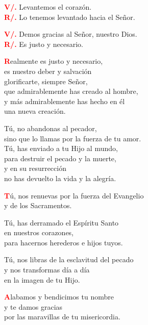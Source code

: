 \documentclass[12pt, letterpaper]{report}
\begin{document}
\noindent
\Large {\bfseries \textcolor{red}{V/.}} \hspace{0.5cm} Levantemos el coraz\'on.\\
\noindent
\Large {\bfseries \textcolor{red}{R/.}} \hspace{0.5cm} Lo tenemos levantado hacia el Se\~nor. 

\noindent
\Large {\bfseries \textcolor{red}{V/.}} \hspace{0.5cm} Demos gracias al Se\~nor, nuestro Dios.\\
\noindent
\Large {\bfseries \textcolor{red}{R/.}} \hspace{0.5cm} Es justo y necesario.

\lettrine[lines=2]{\bfseries \textcolor{red}{R}}{}\Large ealmente es justo y necesario,\\
es nuestro deber y salvaci\'on\\
glorificarte, siempre Se\~nor,\\
que admirablemente has creado al hombre,\\
y m\'as admirablemente has hecho en \'el\\
una nueva creaci\'on.

\noindent
\Large T\'u, no abandonas al pecador,\\
sino que lo llamas por la fuerza de tu amor.\\
T\'u, has enviado a tu Hijo al mundo,\\
para destruir el pecado y la muerte,\\
y en su resurrecci\'on\\
no has devuelto la vida y la alegr\'ia.

\lettrine[lines=2]{\bfseries \textcolor{red}{T}}{}\Large \'u, nos renuevas por la fuerza del Evangelio\\
y de los Sacramentos.

\noindent
\Large T\'u, has derramado el Esp\'iritu Santo\\
en nuestros corazones,\\
para hacernos herederos e hijos tuyos.

\noindent
\Large T\'u, nos libras de la esclavitud del pecado\\
y nos transformas d\'ia a d\'ia\\
en la imagen de tu Hijo.

\lettrine[lines=2]{\bfseries \textcolor{red}{A}}{}\Large labamos y bendicimos tu nombre\\
y te damos gracias\\
por las maravillas de tu misericordia.
\end{document}

